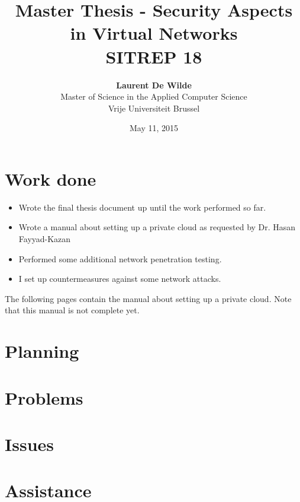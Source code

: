 \documentclass[11pt, a4paper]{article}
\title{Master Thesis -  Security Aspects in Virtual Networks\\ \textbf{SITREP 18}}
\author{\textbf{Laurent De Wilde} \\ Master of Science in the Applied Computer Science \\ Vrije Universiteit Brussel}
\date{May 11, 2015}
\begin{document}
\maketitle


\section*{Work done}

\begin{itemize}
\item Wrote the final thesis document up until the work performed so far.
\item Wrote a manual about setting up a private cloud as requested by Dr. Hasan Fayyad-Kazan
\item Performed some additional network penetration testing.
\item I set up countermeasures against some network attacks.
\end{itemize}

The following pages contain the manual about setting up a private cloud. Note that this manual is not complete yet.



\section*{Planning}



\section*{Problems}



\section*{Issues}



\section*{Assistance}
\end{document}
